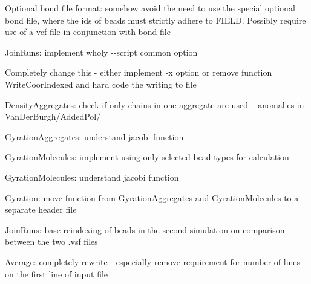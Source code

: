 
\begin{DoxyRefList}
\item[\label{todo__todo000001}%
\Hypertarget{todo__todo000001}%
Page \hyperlink{Common}{Common utilities} ]Optional bond file format\+: somehow avoid the need to use the special optional bond file, where the ids of beads must strictly adhere to F\+I\+E\+LD. Possibly require use of a vcf file in conjunction with bond file 

Join\+Runs\+: implement wholy {\ttfamily -\/-\/script} common option 

Completely change this -\/ either implement {\ttfamily -\/x} option or remove function {\ttfamily Write\+Coor\+Indexed} and hard code the writing to file

Density\+Aggregates\+: check if only chains in one aggregate are used -- anomalies in Van\+Der\+Burgh/\+Added\+Pol/

Gyration\+Aggregates\+: understand {\ttfamily jacobi} function

Gyration\+Molecules\+: implement using only selected bead types for calculation

Gyration\+Molecules\+: understand {\ttfamily jacobi} function

Gyration\+: move function from Gyration\+Aggregates and Gyration\+Molecules to a separate header file

Join\+Runs\+: base reindexing of beads in the second simulation on comparison between the two {\ttfamily .vsf} files 

Average\+: completely rewrite -\/ especially remove requirement for number of lines on the first line of input file 
\end{DoxyRefList}